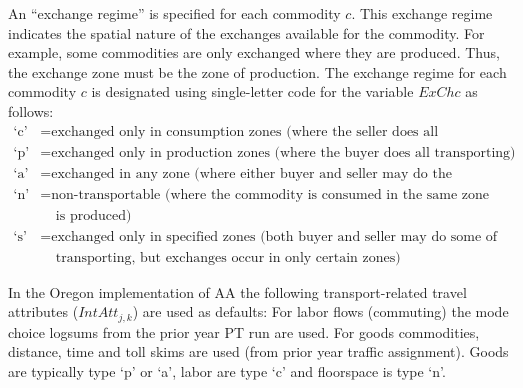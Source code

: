 An ``exchange regime'' is specified for each commodity $c$. This exchange regime indicates the spatial nature of the exchanges available for the commodity. For example, some commodities are only exchanged where they are produced. Thus, the exchange zone must be the zone of production. The exchange regime for each commodity $c$ is designated using single-letter code for the variable $ExChc$ as follows:
\begin{align*}
\text{`c'} &= \text{exchanged only in consumption zones (where the seller does all transporting)} \\
\text{`p'} &= \text{exchanged only in production zones (where the buyer does all transporting)} \\
\text{`a'} &= \text{exchanged in any zone (where either buyer and seller may do the transporting)} \\
\text{`n'} &= \text{non-transportable (where the commodity is consumed in the same zone where it} \\
 &~~~~~\text{is produced)} \\
\text{`s'} &= \text{exchanged only in specified zones (both buyer and seller may do some of the} \\
 &~~~~~\text{transporting, but exchanges occur in only certain zones)}
\end{align*}

In the Oregon implementation of AA the following transport-related travel attributes ($IntAtt_{j,k}$) are used as defaults: For labor flows (commuting) the mode choice logsums from the prior year PT run are used. For goods commodities, distance, time and toll skims are used (from prior year traffic assignment). Goods are typically type `p' or `a', labor are type `c' and floorspace is type `n'.

